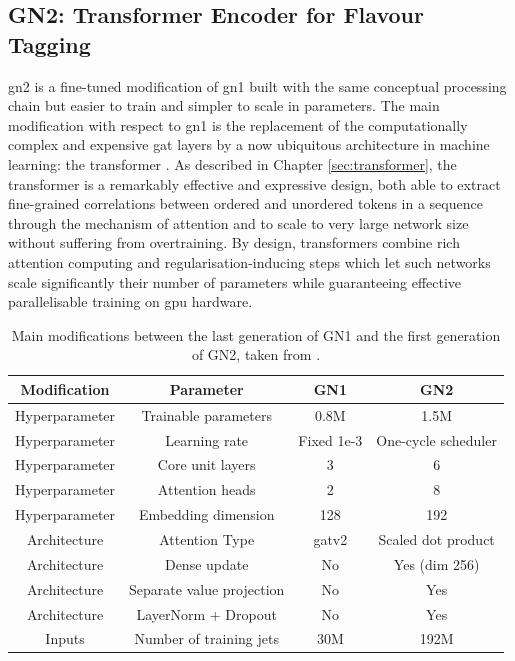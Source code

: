 \subsection{GN2: Transformer Encoder for Flavour Tagging}\label{chap-GN2}
\gls{gn2} is a fine-tuned modification of \gls{gn1} built with the same conceptual processing chain but easier to train and simpler to scale in parameters. The main modification with respect to \gls{gn1} is the replacement of the computationally complex and expensive \gls{gat} layers by a now ubiquitous architecture in machine learning: the transformer \cite{NIPS_transformerPaper}. As described in Chapter \ref{sec:transformer}, the transformer is a remarkably effective and expressive design, both able to extract fine-grained correlations between ordered and unordered tokens in a sequence through the mechanism of attention and to scale to very large network size without suffering from overtraining. By design, transformers combine rich attention computing and regularisation-inducing steps which let such networks scale significantly their number of parameters while guaranteeing effective parallelisable training on \gls{gpu} hardware.  \\

\begin{table}[h]
  \begin{center}
      \begin{tabular}{c|c|c|c} 
      	 \hline \hline
          Modification & Parameter & GN1 & GN2 \\ \hline
          Hyperparameter  & Trainable parameters & 0.8M & 1.5M \\ 
          Hyperparameter  & Learning rate & Fixed 1e-3 & One-cycle scheduler\\ 
          Hyperparameter  & Core unit layers & 3 & 6 \\ 
          Hyperparameter  & Attention heads & 2 & 8 \\ 
          Hyperparameter  & Embedding dimension & 128 & 192 \\ \hline
          Architecture    & Attention Type & \gls{gat}v2 & Scaled dot product \\ 
          Architecture    & Dense update & No & Yes (dim 256) \\ 
          Architecture    & Separate value projection & No & Yes \\ 
          Architecture    & LayerNorm + Dropout & No & Yes \\ \hline
          Inputs          & Number of training jets & 30M & 192M  \\ \hline \hline
      \end{tabular}
    \caption{Main modifications between the last generation of GN1 and the first generation of GN2, taken from \cite{ATL-PLOT-FTAG-2023-01}.}
    \label{tab:gn2compGN1}
  \end{center}
\end{table}

